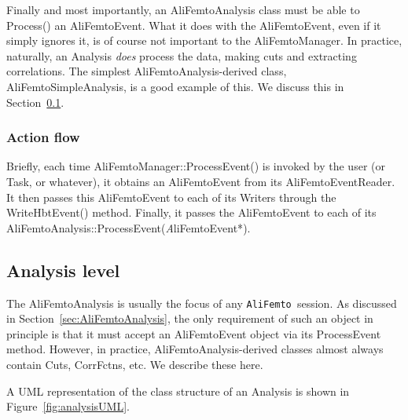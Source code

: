 \documentclass[twoside]{article}
\newcommand{\name}[1]{\textsf{#1}}%
\newcommand{\args}[1]{\textit{#1}}%
\newcommand{\meth}[1]{\textsf{#1}}%
\newcommand{\AliFemto}{{\tt AliFemto }}
\begin{document}
Finally and most importantly, an \name{AliFemtoAnalysis} class must be able to \meth{Process()}
an \name{AliFemtoEvent}.  What it does with the \name{AliFemtoEvent}, even if it simply ignores it, is 
of course not important to the \name{AliFemtoManager}.
In practice, naturally, an Analysis {\it does} process the data, making cuts and extracting correlations.
The simplest \name{AliFemtoAnalysis}-derived class, \name{AliFemtoSimpleAnalysis}, is a good example of this.  We discuss this in
Section~\ref{sec:analysisLevel}.

\subsubsection{Action flow}
Briefly, each time \name{AliFemtoManager}::\meth{ProcessEvent()} is invoked by the user (or Task, or whatever),
it obtains an \name{AliFemtoEvent} from its \name{AliFemtoEventReader}. 
It then passes this \name{AliFemtoEvent} to each of its Writers through the \meth{WriteHbtEvent()} method.
Finally, it passes the \name{AliFemtoEvent} to each of its {\name AliFemtoAnalysis::}{\meth ProcessEvent({\args AliFemtoEvent*})}.



\subsection{Analysis level}
\label{sec:analysisLevel}

The \name{AliFemtoAnalysis} is usually the focus of any \AliFemto session.  As discussed in Section~\ref{sec:AliFemtoAnalysis},
the only requirement of such an object in principle is that it must accept an \name{AliFemtoEvent} object via its \meth{ProcessEvent} method.
However, in practice, \name{AliFemtoAnalysis}-derived classes almost always contain Cuts, CorrFctns, etc.  We describe these
here.

A UML representation of the class structure of an Analysis is shown in Figure~\ref{fig:analysisUML}.
\end{document}
